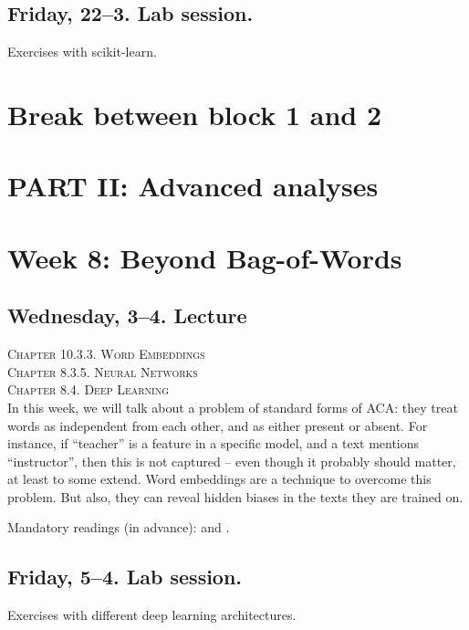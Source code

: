 \subsection*{Friday, 22--3. Lab session.}
Exercises with scikit-learn.




\section*{Break between block 1 and 2}




\section*{PART II: Advanced analyses}


\section*{Week 8: Beyond Bag-of-Words}

\subsection*{Wednesday, 3--4. Lecture}
\textsc{ Chapter 10.3.3. Word Embeddings}\\
\textsc{ Chapter 8.3.5. Neural Networks}\\
\textsc{ Chapter 8.4. Deep Learning}\\

In this week, we will talk about a problem of standard forms of ACA: they treat words as independent from each other, and as either present or absent. For instance, if ``teacher'' is a feature in a specific model, and a text mentions ``instructor'', then this is not captured -- even though it probably should matter, at least to some extend. Word embeddings are a technique to overcome this problem. But also, they can reveal hidden biases in the texts they are trained on. 

Mandatory readings (in advance): \cite{Kusner2015} and \cite{Garg2017}.





\subsection*{Friday, 5--4. Lab session.}
Exercises with different deep learning architectures.


